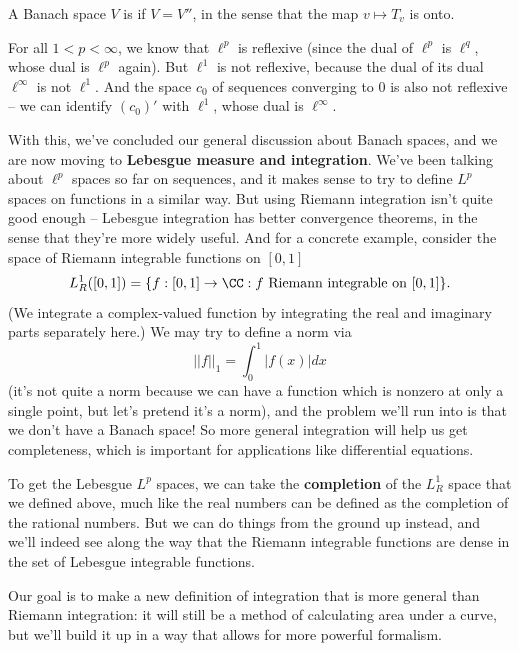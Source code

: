 \begin{definition}
A Banach space $V$ is  if $V = V''$, in the sense that the map $v \mapsto T_v$ is onto.
\end{definition}

\begin{example}
For all $1 < p < \infty$, we know that $\ell^p$ is reflexive (since the dual of $\ell^p$ is $\ell^q$, whose dual is $\ell^p$ again). But $\ell^1$ is not reflexive, because the dual of its dual $\ell^{\infty}$ is not $\ell^1$. And the space $c_0$ of sequences converging to $0$ is also not reflexive -- we can identify $(c_0)'$ with $\ell^1$, whose dual is $\ell^{\infty}$.
\end{example}

With this, we've concluded our general discussion about Banach spaces, and we are now moving to \textbf{Lebesgue measure and integration}. We've been talking about $\ell^p$ spaces so far on sequences, and it makes sense to try to define $L^p$ spaces on functions in a similar way. But using Riemann integration isn't quite good enough -- Lebesgue integration has better convergence theorems, in the sense that they're more widely useful. And for a concrete example, consider the space of Riemann integrable functions on $[0, 1]$
\[
    L^1_R([0, 1]) = \{f: [0, 1] \to \CC: f \text{ Riemann integrable on }[0, 1]\}.
\]
(We integrate a complex-valued function by integrating the real and imaginary parts separately here.) We may try to define a norm via 
\[
    ||f||_1 = \int_0^1 |f(x)| dx
\]
(it's not quite a norm because we can have a function which is nonzero at only a single point, but let's pretend it's a norm), and the problem we'll run into is that we don't have a Banach space! So more general integration will help us get completeness, which is important for applications like differential equations.

To get the Lebesgue $L^p$ spaces, we can take the \textbf{completion} of the $L_R^1$ space that we defined above, much like the real numbers can be defined as the completion of the rational numbers. But we can do things from the ground up instead, and we'll indeed see along the way that the Riemann integrable functions are dense in the set of Lebesgue integrable functions.

\begin{fact}
Our goal is to make a new definition of integration that is more general than Riemann integration: it will still be a method of calculating area under a curve, but we'll build it up in a way that allows for more powerful formalism.
\end{fact}

